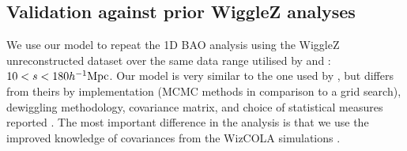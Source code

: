 \documentclass[iop,twocolappendix]{emulateapj}
\begin{document}

\subsection{Validation against prior WiggleZ analyses}


We use our model to repeat the 1D BAO analysis using the WiggleZ unreconstructed dataset over the same data range utilised by \citet{BlakeDavis2011} and \citet{BlakeKazin2011}: $10<s<180 h^{-1}\rm{Mpc}$. Our model is very similar to the one used by \citet{BlakeKazin2011}, but differs from theirs by implementation (MCMC methods in comparison to a grid search), dewiggling methodology, covariance matrix, and choice of statistical measures reported \citep[we use maximum likelihood statistics, as opposed to mean statistics used in][]{BlakeDavis2011}. The most important difference in the analysis is that we use the improved knowledge of covariances from the WizCOLA simulations \citep[as compared to the lognormal realisations used in][]{BlakeKazin2011}.
\end{document}
